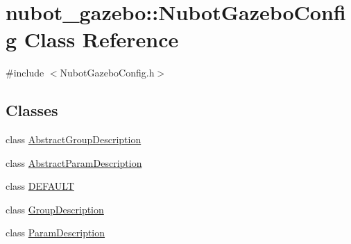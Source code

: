 \hypertarget{classnubot__gazebo_1_1NubotGazeboConfig}{\section{nubot\-\_\-gazebo\-:\-:Nubot\-Gazebo\-Config Class Reference}
\label{classnubot__gazebo_1_1NubotGazeboConfig}
}


{\ttfamily \#include $<$Nubot\-Gazebo\-Config.\-h$>$}

\subsection*{Classes}
\begin{DoxyCompactItemize}
\item 
class \hyperlink{classnubot__gazebo_1_1NubotGazeboConfig_1_1AbstractGroupDescription}{Abstract\-Group\-Description}
\item 
class \hyperlink{classnubot__gazebo_1_1NubotGazeboConfig_1_1AbstractParamDescription}{Abstract\-Param\-Description}
\item 
class \hyperlink{classnubot__gazebo_1_1NubotGazeboConfig_1_1DEFAULT}{D\-E\-F\-A\-U\-L\-T}
\item 
class \hyperlink{classnubot__gazebo_1_1NubotGazeboConfig_1_1GroupDescription}{Group\-Description}
\item 
class \hyperlink{classnubot__gazebo_1_1NubotGazeboConfig_1_1ParamDescription}{Param\-Description}
\end{DoxyCompactItemize}

